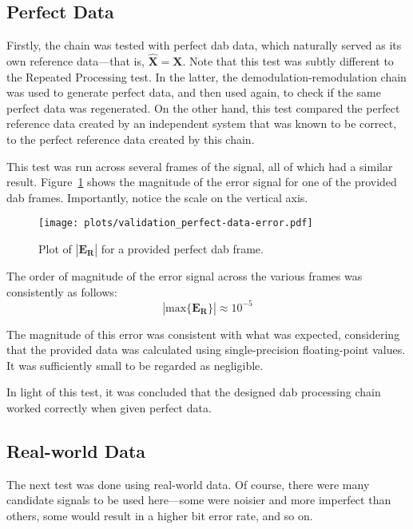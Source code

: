 \documentclass[class=report,11pt,crop=false]{standalone}
\begin{document}
\subsection{Perfect Data}
Firstly, the chain was tested with perfect \gls{dab} data, which naturally served as its own reference data---that is, \(\mathbf{\hat{X}} = \mathbf{X}\). Note that this test was subtly different to the Repeated Processing test. In the latter, the demodulation-remodulation chain was used to generate perfect data, and then used again, to check if the same perfect data was regenerated. On the other hand, this test compared the perfect reference data created by an independent system that was known to be correct, to the perfect reference data created by this chain.

This test was run across several frames of the signal, all of which had a similar result. Figure~\ref{fig:validation_perfect-data-error} shows the magnitude of the error signal for one of the provided \gls{dab} frames. Importantly, notice the scale on the vertical axis.
\begin{figure}
  \centering
  \captionsetup{type=figure}
  \texttt{[image: plots/validation\_perfect-data-error.pdf]}
  \caption{Plot of \(|\mathbf{E_R}|\) for a provided perfect \gls{dab} frame.}
  \label{fig:validation_perfect-data-error}
\end{figure}
The order of magnitude of the error signal across the various frames was consistently as follows:
\begin{equation}
  \left| \mathrm{max} \{ \mathbf{E_R} \} \right| \approx 10^{-5}
\end{equation}

The magnitude of this error was consistent with what was expected, considering that the provided data was calculated using single-precision floating-point values. It was sufficiently small to be regarded as negligible.

In light of this test, it was concluded that the designed \gls{dab} processing chain worked correctly when given perfect data.

\subsection{Real-world Data}
The next test was done using real-world data. Of course, there were many candidate signals to be used here---some were noisier and more imperfect than others, some would result in a higher bit error rate, and so on.
\end{document}
